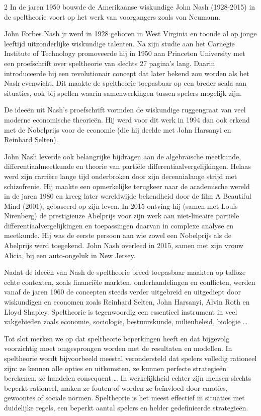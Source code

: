 \begin{multicols}{2}
In de jaren 1950 bouwde de Amerikaanse wiskundige John Nash (1928-2015) in de speltheorie voort op het werk van voorgangers zoals von Neumann.

John Forbes Nash jr werd in 1928 geboren in West Virginia en toonde al op jonge leeftijd uitzonderlijke wiskundige talenten. Na zijn studie aan het Carnegie Institute of Technology promoveerde hij in 1950 aan Princeton University met een proefschrift over speltheorie van slechts 27 pagina’s lang. Daarin introduceerde hij een 
revolutionair concept dat later bekend zou worden als het Nash-evenwicht. Dit maakte de speltheorie toepasbaar op een breder scala aan situaties, ook bij spellen waarin samenwerkingen tussen spelers mogelijk zijn.


De ideeën uit Nash's proefschrift vormden de wiskundige ruggengraat van veel moderne economische theorieën. Hij werd voor dit werk in 1994 dan ook erkend met de Nobelprijs voor de economie (die hij deelde met John Harsanyi en Reinhard Selten).

John Nash leverde ook belangrijke bijdragen aan de algebraïsche meetkunde, differentiaalmeetkunde en theorie van partiële differentiaalvergelijkingen. Helaas werd zijn carrière lange tijd onderbroken door zijn decennialange strijd met schizofrenie. Hij maakte een opmerkelijke terugkeer naar de academische wereld in de jaren 1980 en kreeg later wereldwijde bekendheid door de film A Beautiful Mind (2001), gebaseerd op zijn leven. In 2015 ontving hij (samen met Louis Nirenberg) de prestigieuze Abelprijs voor zijn werk aan niet-lineaire partiële differentiaalvergelijkingen en toepassingen daarvan in complexe analyse en meetkunde. Hij  was de eerste persoon aan wie zowel een Nobelprijs als de Abelprijs werd toegekend. John Nash overleed in 2015, samen met zijn vrouw Alicia, bij een auto-ongeluk in New Jersey.

Nadat de ideeën van Nash de speltheorie breed toepasbaar maakten op talloze echte contexten, zoals financiële markten, onderhandelingen en conflicten, werden vanaf de jaren 1960 de concepten steeds verder uitgebreid en uitgediept door wiskundigen en economen zoals Reinhard Selten, John Harsanyi, Alvin Roth en Lloyd Shapley. Speltheorie is tegenwoordig een essentieel instrument in veel vakgebieden zoals economie, sociologie, bestuurskunde, milieubeleid, biologie …

Tot slot merken we op dat speltheorie beperkingen heeft en dat bijgevolg voorzichtig moet omgesprongen worden met de resultaten en modellen. In speltheorie wordt bijvoorbeeld meestal verondersteld dat spelers volledig rationeel zijn: ze kennen alle opties en uitkomsten, ze kunnen perfecte strategieën berekenen, ze handelen consequent … In werkelijkheid echter zijn mensen slechts beperkt rationeel, maken ze fouten of worden ze beïnvloed door emoties, gewoontes of sociale normen. Speltheorie is het meest effectief in situaties met duidelijke regels, een beperkt aantal spelers en helder gedefinieerde strategieën.
\stopcontents[inhoudloep]		%
\end{multicols}

